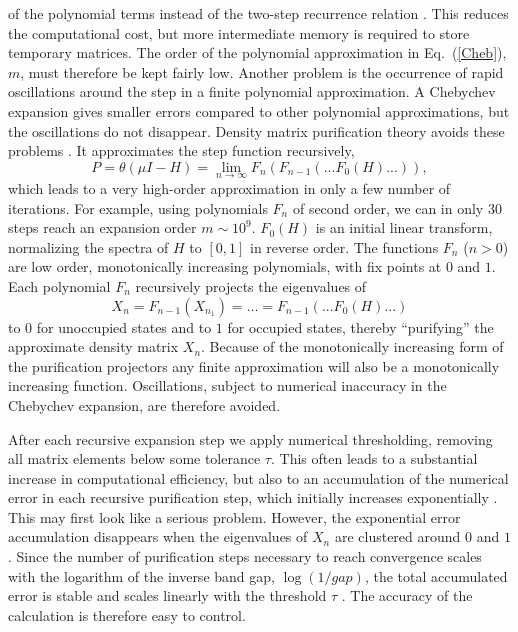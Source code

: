 \documentclass[twocolumn,showpacs,preprintnumbers,amsmath,amssymb]{revtex4}
\begin{document}
of the polynomial terms instead of the two-step recurrence relation \cite{Paterson73,Liang04,NiklassonIPUR}. 
This reduces the computational cost, but more intermediate memory is required to store
temporary matrices.  The order of the polynomial approximation in Eq.\ (\ref{Cheb}), $m$, must therefore
be kept fairly low. Another problem is the occurrence of rapid oscillations around the step in a finite polynomial 
approximation. A Chebychev expansion gives smaller errors compared to other polynomial
approximations, but the oscillations do not disappear.  Density matrix purification theory avoids these problems
\cite{McWeeny60,Clinton69,Palser98,Holas01,NiklassonTC2,NiklassonTRS4,NiklassonIPUR,Mazziotti03,NiklassonPRT1}.
It approximates the step function recursively,
\begin{equation}\label{Rec}
 P = \theta(\mu I -H) = \lim_{n \rightarrow \infty} F_n(F_{n-1}(...F_0(H)...)),
\end{equation}
which leads to a very high-order approximation in only a few number of iterations.
For example, using polynomials $F_n$ of second order, we can in only 30 steps reach an
expansion order $m \sim 10^9$.
$F_0(H)$ is an initial linear transform, normalizing
the spectra of $H$ to $[0,1]$ in reverse order. The functions $F_n$ ($n>0$) are low order,
monotonically increasing polynomials, with fix points at $0$ and $1$. Each
polynomial $F_n$ recursively projects the eigenvalues of 
\begin{equation}
X_n = F_{n-1}(X_{n_1})= \ldots = F_{n-1}(...F_0(H)...)
\end{equation}
to $0$ for unoccupied states and to $1$ for occupied states, thereby ``purifying'' the approximate 
density matrix $X_n$.  Because of the monotonically increasing form of the purification projectors any 
finite approximation will also be a monotonically increasing function. Oscillations, subject to numerical
inaccuracy in the Chebychev expansion, are therefore avoided.

After each recursive expansion step we apply numerical thresholding, removing all matrix elements below
some tolerance $\tau$. This often leads to a substantial increase in computational efficiency, but also
to an accumulation of the numerical error in each recursive purification step, which initially increases
exponentially \cite{NiklassonTRS4}. This may first look like a serious problem. However, the exponential 
error accumulation disappears when the eigenvalues of $X_n$ are clustered around $0$ and $1$. Since the 
number of purification steps necessary to reach convergence scales with the logarithm of the inverse
band gap, $\log ( 1/gap)$, the total accumulated error is stable and scales linearly with 
the threshold $\tau$ \cite{NiklassonTRS4}. The accuracy of the calculation is therefore easy
to control.
\end{document}
